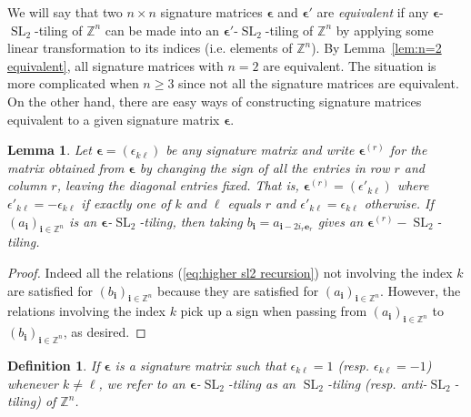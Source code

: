 \documentclass[12pt]{amsart}
\newtheorem{definition}[theorem]{Definition}
\newtheorem{lemma}[theorem]{Lemma}
\newcommand{\bepsilon}{\boldsymbol{\epsilon}}
\newcommand{\be}{\boldsymbol{e}}
\newcommand{\bi}{\boldsymbol{i}}
\newcommand{\SL}{\operatorname{SL}}
\newcommand{\ZZ}{\mathbb{Z}}
\begin{document}
  We will say that two $n\times n$ signature matrices $\bepsilon$ and $\bepsilon'$ are \emph{equivalent} if any $\bepsilon$-$\SL_2$-tiling of $\ZZ^n$ can be made into an $\bepsilon'$-$\SL_2$-tiling of $\ZZ^n$ by applying some linear transformation to its indices (i.e. elements of $\ZZ^n$).
  By Lemma~\ref{lem:n=2 equivalent}, all signature matrices with $n=2$ are equivalent.
  The situation is more complicated when $n\geq 3$ since not all the signature matrices are equivalent.
  On the other hand, there are easy ways of constructing signature matrices equivalent to a given signature matrix $\bepsilon$.
  \begin{lemma}\label{le:flip}
    Let $\bepsilon=(\epsilon_{k\ell})$ be any signature matrix and write $\bepsilon^{(r)}$ for the matrix obtained from $\bepsilon$ by changing the sign of all the entries in row $r$ and column $r$, leaving the diagonal entries fixed.
    That is, $\bepsilon^{(r)} =(\epsilon'_{k\ell})$ where $\epsilon'_{k\ell}=-\epsilon_{k\ell}$ if exactly one of $k$ and $\ell$ equals $r$ and $\epsilon'_{k\ell}=\epsilon_{k\ell}$ otherwise.
    If $(a_{\bi})_{\bi\in\ZZ^n}$ is an $\bepsilon$-$\SL_2$-tiling, then taking $b_{\bi}=a_{\bi-2i_r\be_r}$ gives an $\bepsilon^{(r)}-\SL_2$-tiling.
  \end{lemma}
  \begin{proof}
    Indeed all the relations (\ref{eq:higher sl2 recursion}) not involving the index $k$ are satisfied for $(b_{\bi})_{\bi\in\ZZ^n}$ because they are satisfied for $(a_{\bi})_{\bi\in\ZZ^n}$.
    However, the relations involving the index $k$ pick up a sign when passing from $(a_{\bi})_{\bi\in\ZZ^n}$ to $(b_{\bi})_{\bi\in\ZZ^n}$, as desired.
  \end{proof}
  \begin{definition}
    If $\bepsilon$ is a signature matrix such that $\epsilon_{k\ell}=1$ (resp. $\epsilon_{k\ell}=-1$) whenever $k\neq\ell$, we refer to an $\bepsilon$-$\SL_2$-tiling as an \emph{$\SL_2$-tiling} (resp. \emph{anti-$\SL_2$-tiling}) of $\ZZ^n$.
  \end{definition}
\end{document}
